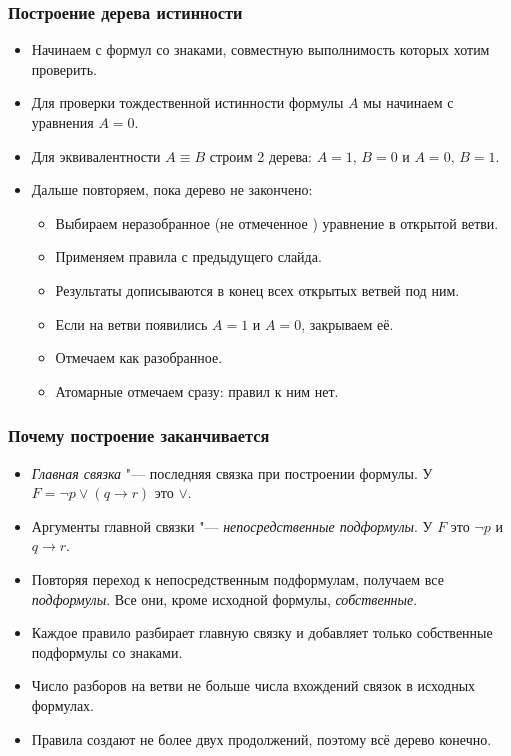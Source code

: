 \begin{frame}
\frametitle{Построение дерева истинности}
\begin{itemize}
    \item Начинаем с формул со знаками, совместную выполнимость которых хотим проверить.
    \item Для проверки тождественной истинности формулы $A$ мы начинаем с уравнения $A=0$.
    \item Для эквивалентности $A \equiv B$ строим 2 дерева: \pause $A=1,\, B=0$ и $A=0,\, B=1$.
    \pause
    \item Дальше повторяем, пока дерево не закончено:
    \begin{itemize}
        \item Выбираем неразобранное (не отмеченное \checkmark) уравнение в открытой ветви.
        \item Применяем правила с предыдущего слайда.
        \item Результаты дописываются в конец всех открытых ветвей под ним.
        \item Если на ветви появились $A=1$ и $A=0$, закрываем её.
        \item Отмечаем как разобранное.
        \item Атомарные отмечаем сразу: правил к ним нет.
    \end{itemize}
\end{itemize}
\end{frame}

\begin{frame}
\frametitle{Почему построение заканчивается}
\begin{itemize}
    \item \emph{Главная связка} "--- последняя связка при построении формулы. У $F = \neg p \lor (q \to r)$ это $\lor$.
    \pause
    \item Аргументы главной связки "--- \emph{непосредственные подформулы}. У $F$ это $\neg p$ и $q \to r$.
    \item Повторяя переход к непосредственным подформулам, получаем все \emph{подформулы}. Все они, кроме исходной формулы, \emph{собственные}.
    \pause
    \item Каждое правило разбирает главную связку и добавляет только собственные подформулы со знаками.
    \item Число разборов на ветви не больше числа вхождений связок в исходных формулах.
    \item Правила создают не более двух продолжений, поэтому всё дерево конечно.
\end{itemize}
\end{frame}

